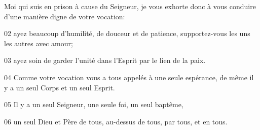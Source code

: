 Moi qui suis en prison à cause du Seigneur, je vous exhorte donc à vous conduire d’une manière digne de votre vocation:

02 ayez beaucoup d’humilité, de douceur et de patience, supportez-vous les uns les autres avec amour;

03 ayez soin de garder l’unité dans l’Esprit par le lien de la paix.

04 Comme votre vocation vous a tous appelés à une seule espérance, de même il y a un seul Corps et un seul Esprit.

05 Il y a un seul Seigneur, une seule foi, un seul baptême,

06 un seul Dieu et Père de tous, au-dessus de tous, par tous, et en tous.
